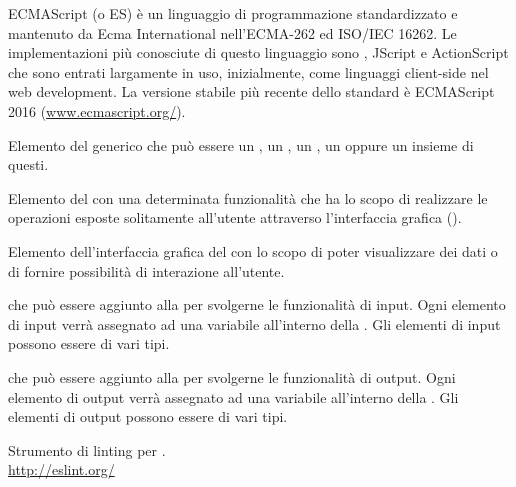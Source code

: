 ECMAScript (o ES) è un linguaggio di programmazione standardizzato e mantenuto da Ecma International nell'ECMA-262 ed ISO/IEC 16262. Le implementazioni più conosciute di questo linguaggio sono , JScript e ActionScript che sono entrati largamente in uso, inizialmente, come linguaggi client-side nel web development.
La versione stabile più recente dello standard è ECMAScript 2016 (\url{www.ecmascript.org/}).

Elemento del  generico che può essere un , un , un , un  oppure un insieme di questi.

Elemento del  con una determinata funzionalità che ha lo scopo di realizzare le operazioni esposte solitamente all'utente attraverso l’interfaccia grafica ().

Elemento dell’interfaccia grafica del  con lo scopo di poter visualizzare dei dati o di fornire possibilità di interazione all’utente.

 che può essere aggiunto alla  per svolgerne le funzionalità di input. Ogni elemento di input verrà assegnato ad una variabile all’interno della . Gli elementi di input possono essere di vari tipi.

 che può essere aggiunto alla  per svolgerne le funzionalità di output. Ogni elemento di output verrà assegnato ad una variabile all’interno della . Gli elementi di output possono essere di vari tipi.

Strumento di linting per .\\
\url{http://eslint.org/}
\clearpage
